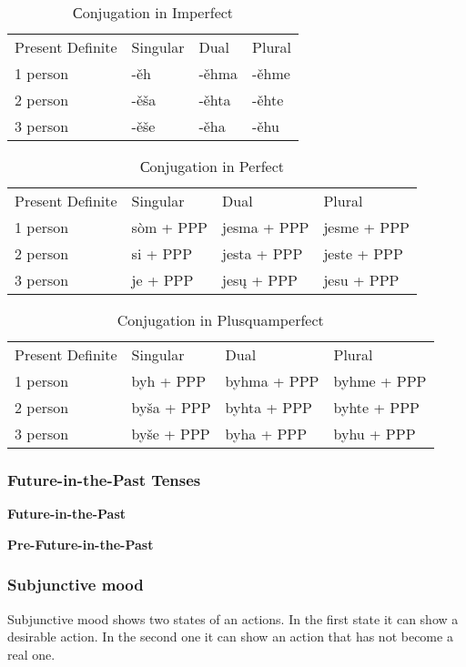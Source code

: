 \begin{table}[!htb]
	\caption{Сonjugation in Imperfect}
	\begin{tabular}{llll}
		Present Definite & Singular & Dual & Plural \\
		1 person & -ěh & -ěhma & -ěhme \\
		2 person & -ěša & -ěhta & -ěhte \\
		3 person & -ěše & -ěha & -ěhu
	\end{tabular}
\end{table}

\begin{table}[!htb]
	\caption{Сonjugation in Perfect}
	\begin{tabular}{llll}
		Present Definite & Singular & Dual & Plural \\
		1 person & sòm + PPP & jesma + PPP & jesme + PPP \\
		2 person & si + PPP & jesta + PPP & jeste  + PPP \\
		3 person & je + PPP & jesų + PPP & jesu + PPP 
	\end{tabular}
\end{table}

\begin{table}[!htb]
	\caption{Conjugation in Plusquamperfect}
	\begin{tabular}{llll}
		Present Definite & Singular & Dual & Plural \\
		1 person & byh + PPP & byhma + PPP & byhme + PPP \\
		2 person & byša + PPP & byhta + PPP & byhte  + PPP \\
		3 person & byše + PPP & byha + PPP & byhu + PPP 
	\end{tabular}
\end{table}

\subsubsection{Future-in-the-Past Tenses}


\textbf{Future-in-the-Past}

\textbf{Pre-Future-in-the-Past}

\subsubsection{Subjunctive mood}

Subjunctive mood shows two states of an actions. In the first state it can show a desirable action. In the second one it can show an action that has not become a real one. 

